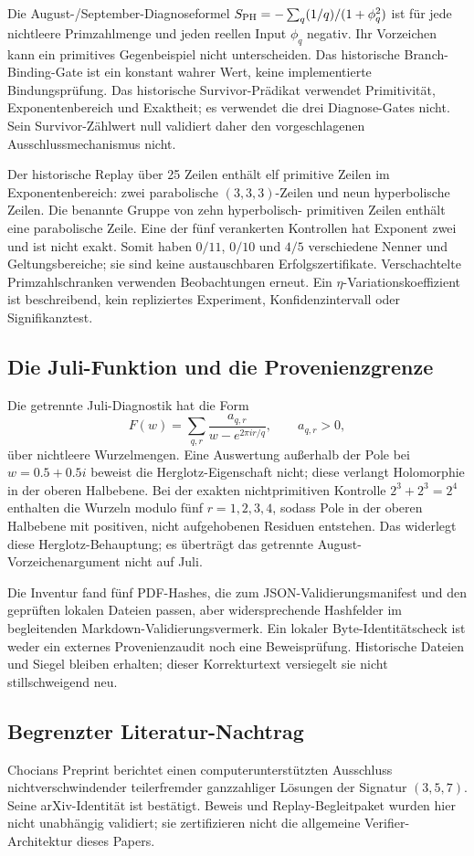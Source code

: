 \documentclass[11pt,a4paper]{article}
\begin{document}
Die August-/September-Diagnoseformel
$S_{\rm PH}=-\sum_q (1/q)/(1+\phi_q^2)$ ist für jede nichtleere
Primzahlmenge und jeden reellen Input $\phi_q$ negativ.
Ihr Vorzeichen kann ein primitives Gegenbeispiel nicht unterscheiden.
Das historische Branch-Binding-Gate ist ein konstant wahrer Wert,
keine implementierte Bindungsprüfung.
Das historische Survivor-Prädikat verwendet Primitivität,
Exponentenbereich und Exaktheit; es verwendet die drei Diagnose-Gates
nicht. Sein Survivor-Zählwert null validiert daher den vorgeschlagenen
Ausschlussmechanismus nicht.

Der historische Replay über 25 Zeilen enthält elf primitive Zeilen
im Exponentenbereich: zwei parabolische $(3,3,3)$-Zeilen und neun
hyperbolische Zeilen. Die benannte Gruppe von zehn hyperbolisch-
primitiven Zeilen enthält eine parabolische Zeile.
Eine der fünf verankerten Kontrollen hat Exponent zwei und ist
nicht exakt. Somit haben $0/11$, $0/10$ und $4/5$ verschiedene
Nenner und Geltungsbereiche; sie sind keine austauschbaren
Erfolgszertifikate. Verschachtelte Primzahlschranken verwenden
Beobachtungen erneut. Ein $\eta$-Variationskoeffizient ist
beschreibend, kein repliziertes Experiment, Konfidenzintervall
oder Signifikanztest.

\subsection{Die Juli-Funktion und die Provenienzgrenze}
Die getrennte Juli-Diagnostik hat die Form
\[
 F(w)=\sum_{q,r}\frac{a_{q,r}}{w-e^{2\pi i r/q}},
 \qquad a_{q,r}>0,
\]
über nichtleere Wurzelmengen. Eine Auswertung außerhalb der Pole
bei $w=0.5+0.5i$ beweist die Herglotz-Eigenschaft nicht;
diese verlangt Holomorphie in der oberen Halbebene.
Bei der exakten nichtprimitiven Kontrolle $2^3+2^3=2^4$ enthalten
die Wurzeln modulo fünf $r=1,2,3,4$, sodass Pole in der oberen
Halbebene mit positiven, nicht aufgehobenen Residuen entstehen.
Das widerlegt diese Herglotz-Behauptung; es überträgt das getrennte
August-Vorzeichenargument nicht auf Juli.

Die Inventur fand fünf PDF-Hashes, die zum JSON-Validierungsmanifest
und den geprüften lokalen Dateien passen, aber widersprechende
Hashfelder im begleitenden Markdown-Validierungsvermerk.
Ein lokaler Byte-Identitätscheck ist weder ein externes
Provenienzaudit noch eine Beweisprüfung. Historische Dateien
und Siegel bleiben erhalten; dieser Korrekturtext versiegelt
sie nicht stillschweigend neu.

\subsection{Begrenzter Literatur-Nachtrag}
Chocians Preprint \cite{Chocian2026} berichtet einen
computerunterstützten Ausschluss nichtverschwindender teilerfremder
ganzzahliger Lösungen der Signatur $(3,5,7)$.
Seine arXiv-Identität ist bestätigt. Beweis und Replay-Begleitpaket
wurden hier nicht unabhängig validiert; sie zertifizieren nicht
die allgemeine Verifier-Architektur dieses Papers.
\end{document}
